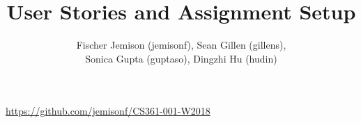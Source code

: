 \documentclass[12pt]{article}
\title{User Stories and Assignment Setup}
\author{Fischer Jemison (jemisonf), Sean Gillen (gillens), \\
Sonica Gupta (guptaso), Dingzhi Hu (hudin) }
\begin{document}
\maketitle
\centerline{\url{https://github.com/jemisonf/CS361-001-W2018}}
\tableofcontents






\end{document}

